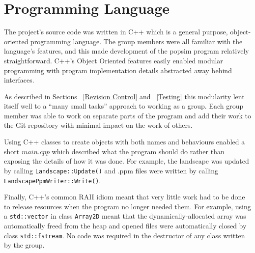\section{Programming Language}
\label{Programming Language}

The project's source code was written in C++ which is a general purpose, object-oriented programming language. 
The group members were all familiar with the language's features, and this made development of the popsim program relatively straightforward. 
C++'s Object Oriented features easily enabled modular programming with program implementation details abstracted away behind interfaces.

As described in Sections ~\ref{Revision Control} and ~\ref{Testing} this modularity lent itself well to a ``many small tasks'' approach to working as a group.  
Each group member was able to work on separate parts of the program and add their work to the Git repository with minimal impact on the work of others.

Using C++ classes to create objects with both names and behaviours enabled a short $main.cpp$ which described what the program should do rather than exposing the details of how it was done.  
For example, the landscape was updated by calling \texttt{Landscape::Update()} and .ppm files were written by calling \texttt{LandscapePpmWriter::Write()}.

Finally, C++'s common RAII idiom meant that very little work had to be done to release resources when the program no longer needed them.  
For example, using a \texttt{std::vector} in class \texttt{Array2D} meant that the dynamically-allocated array was automatically freed from the heap and opened files were automatically closed by class \texttt{std::fstream}. 
No code was required in the destructor of any class written by the group.
